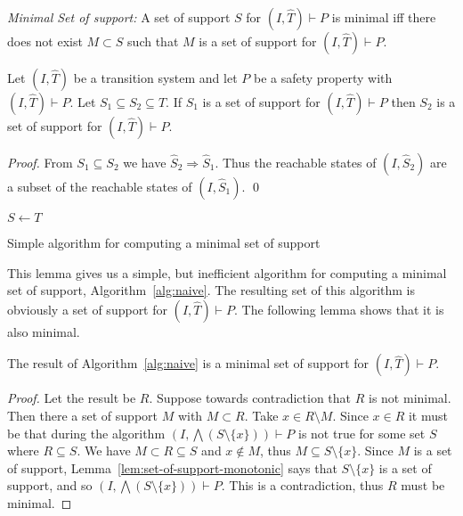 \begin{definition}{\emph{Minimal Set of support:}}
  \label{def:minimal-set-of-support}
  A set of support $S$ for $(I, \widehat T)\vdash P$ is minimal iff
  there does not exist $M \subset S$ such that $M$ is a set of support
  for $(I, \widehat T)\vdash P$.
\end{definition}

\begin{lemma}
  \label{lem:set-of-support-monotonic}
  Let $(I, \widehat T)$ be a transition system and let $P$ be a
  safety property with $(I, \widehat T)\vdash P$. Let $S_1 \subseteq
  S_2 \subseteq T$. If $S_1$ is a set of support for $(I, \widehat
  T)\vdash P$ then $S_2$ is a set of support for $(I, \widehat T)\vdash P$.
\end{lemma}
\begin{proof}
  From $S_1 \subseteq S_2$ we have $\widehat S_2 \Rightarrow \widehat
  S_1$. Thus the reachable states of $(I, \widehat S_2)$ are a subset
  of the reachable states of $(I, \widehat S_1)$. \qed
\end{proof}

\begin{algorithm}[t]
  \BlankLine
  $S \leftarrow T$ \\
   {
  }
\caption{Simple algorithm for computing a minimal set of support}
\label{alg:naive}
\end{algorithm}

This lemma gives us a simple, but inefficient algorithm for computing
a minimal set of support, Algorithm~\ref{alg:naive}. The resulting set
of this algorithm is obviously a set of support for $(I, \widehat
T)\vdash P$. The following lemma shows that it is also minimal.

\begin{lemma}
  The result of Algorithm~\ref{alg:naive} is a minimal set of support
  for $(I, \widehat T)\vdash P$.
\end{lemma}
\begin{proof}
  Let the result be $R$. Suppose towards contradiction that $R$ is not
  minimal. Then there a set of support $M$ with $M \subset R$. Take $x
  \in R\setminus M$. Since $x \in R$ it must be that during the
  algorithm $(I, \bigwedge(S\setminus\{x\}))\vdash P$ is not true for
  some set $S$ where $R \subseteq S$. We have $M \subset R \subseteq
  S$ and $x\not\in M$, thus $M \subseteq S\setminus \{x\}$. Since $M$
  is a set of support, Lemma~\ref{lem:set-of-support-monotonic} says
  that $S\setminus \{x\}$ is a set of support, and so $(I, \bigwedge
  (S\setminus\{x\}))\vdash P$. This is a contradiction, thus $R$ must
  be minimal.
\end{proof}

